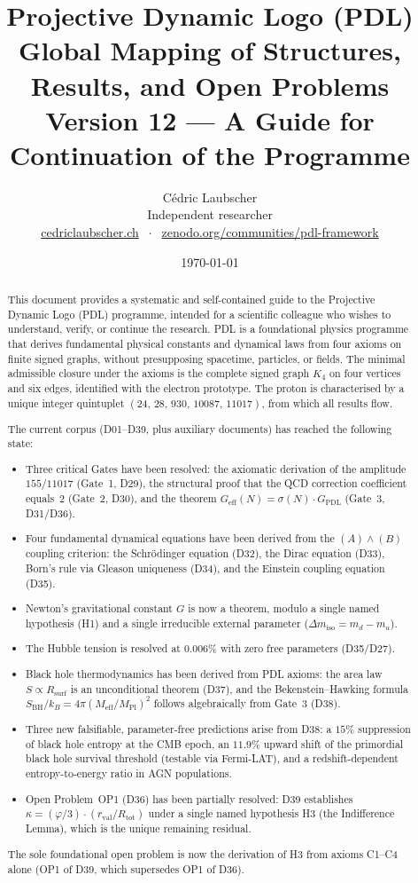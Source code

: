 \documentclass[11pt,a4paper]{article}
\title{Projective Dynamic Logo (PDL)\\[4pt]
\large Global Mapping of Structures, Results, and Open Problems\\[2pt]
\normalsize Version 12 — A Guide for Continuation of the Programme}
\author{C\'edric Laubscher\\[4pt]
\small Independent researcher\\
\small \href{https://cedriclaubscher.ch}{cedriclaubscher.ch}
$\;\cdot\;$
\small \href{https://zenodo.org/communities/pdl-framework/}{zenodo.org/communities/pdl-framework}}
\date{\today}
\theoremstyle{plain}
\theoremstyle{definition}
\theoremstyle{remark}
\newcommand{\Kfour}{K_4}
\newcommand{\quintuplet}{(24,\,28,\,930,\,10087,\,11017)}
\newcommand{\Geff}{G_{\mathrm{eff}}}
\newcommand{\GPDL}{G_{\mathrm{PDL}}}
\newcommand{\rval}{r_{\mathrm{val}}}
\newcommand{\Rsurf}{R_{\mathrm{surf}}}
\newcommand{\Rtot}{R_{\mathrm{tot}}}
\newcommand{\sigmaN}{\sigma(N)}
\newcommand{\SBH}{S_{\mathrm{BH}}}
\newcommand{\Meff}{M_{\mathrm{eff}}}
\newcommand{\MPl}{M_{\mathrm{Pl}}}
\begin{document}
\maketitle
\setcounter{tocdepth}{2}
\tableofcontents
\clearpage

\begin{abstract}
This document provides a systematic and self-contained guide to the Projective Dynamic Logo (PDL) programme, intended for a scientific colleague who wishes to understand, verify, or continue the research.
PDL is a foundational physics programme that derives fundamental physical constants and dynamical laws from four axioms on finite signed graphs, without presupposing spacetime, particles, or fields.
The minimal admissible closure under the axioms is the complete signed graph $\Kfour$ on four vertices and six edges, identified with the electron prototype.
The proton is characterised by a unique integer quintuplet $\quintuplet$, from which all results flow.

The current corpus (D01--D39, plus auxiliary documents) has reached the following state:
\begin{itemize}
\item Three critical Gates have been resolved: the axiomatic derivation of the amplitude $155/11017$ (Gate~1, D29), the structural proof that the QCD correction coefficient equals~2 (Gate~2, D30), and the theorem $\Geff(N)=\sigmaN\cdot\GPDL$ (Gate~3, D31/D36).
\item Four fundamental dynamical equations have been derived from the $(A)\wedge(B)$ coupling criterion: the Schr\"odinger equation (D32), the Dirac equation (D33), Born's rule via Gleason uniqueness (D34), and the Einstein coupling equation (D35).
\item Newton's gravitational constant $G$ is now a theorem, modulo a single named hypothesis (H1) and a single irreducible external parameter ($\Delta m_{\mathrm{iso}} = m_d - m_u$).
\item The Hubble tension is resolved at $0.006\%$ with zero free parameters (D35/D27).
\item Black hole thermodynamics has been derived from PDL axioms: the area law $S \propto \Rsurf$ is an unconditional theorem (D37), and the Bekenstein--Hawking formula $\SBH/k_B = 4\pi(\Meff/\MPl)^2$ follows algebraically from Gate~3 (D38).
\item Three new falsifiable, parameter-free predictions arise from D38: a $15\%$ suppression of black hole entropy at the CMB epoch, an $11.9\%$ upward shift of the primordial black hole survival threshold (testable via Fermi-LAT), and a redshift-dependent entropy-to-energy ratio in AGN populations.
\item Open Problem~OP1 (D36) has been partially resolved: D39 establishes $\kappa = (\varphi/3)\cdot(\rval/\Rtot)$ under a single named hypothesis H3 (the Indifference Lemma), which is the unique remaining residual.
\end{itemize}
The sole foundational open problem is now the derivation of H3 from axioms C1--C4 alone (OP1 of D39, which supersedes OP1 of D36).
\end{abstract}
\end{document}
